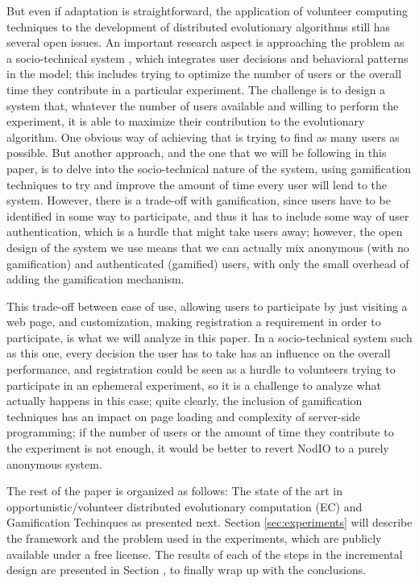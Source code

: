 \documentclass{llncs}
\begin{document}
But even if adaptation is straightforward, the application of volunteer
computing techniques to the development of distributed evolutionary algorithms
still has several open issues. An important research aspect is
approaching the problem as a socio-technical system
\cite{vespignani2009predicting,merelo2015designing}, which integrates
user decisions and behavioral patterns in the model; this
includes trying to optimize the number of users or the overall time
they contribute in a particular
experiment. The challenge is to design a system that, whatever the
number of users available and willing to perform the experiment, it is able to
maximize their contribution to the evolutionary algorithm. One obvious
way of achieving that is trying to find as many users as possible. But
another approach, and the one that we will be following in this paper, is
to delve into the socio-technical nature of the system, using
gamification techniques to try and improve the amount of time every user will
lend to the system. However, there is a trade-off with gamification,
since users have to be identified in some way to participate, and thus
it has to include some way of user authentication,
which is a hurdle that might take users away; however, the open design %
of the system we use means that we can actually mix anonymous (with no
gamification) and authenticated (gamified) users, with only the small overhead
of adding the gamification mechanism.

This trade-off between ease of use, allowing users to
participate by just visiting a web page, and customization, making
registration a requirement in order to %
participate, is what we will analyze in this paper. In a socio-technical system such as this one, every
decision the user has to take has an influence on the overall
performance, and registration could be seen as a hurdle to volunteers
trying to participate in an ephemeral experiment, so it is a challenge
to analyze what actually happens in this case; quite clearly, the
inclusion of gamification techniques has an impact on page loading and
complexity of server-side programming; if the number of users
or the amount of time they contribute to the experiment is not enough,
it would be better to revert NodIO to a purely anonymous system.

The rest of the paper is organized as follows: The state of the art in opportunistic/volunteer distributed evolutionary
computation (EC) and Gamification Techinques as presented next. Section \ref{sec:experiments} will describe the
framework and the problem used in the experiments, which are publicly
available under a free license. The results of each of the steps in the incremental design are presented in Section
\label{sec:results}, to finally wrap up with the conclusions. %
\end{document}
